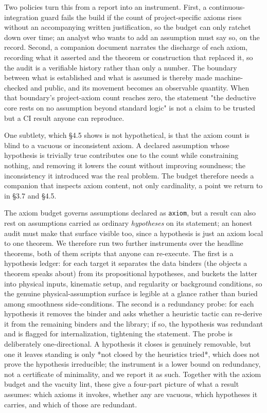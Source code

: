 \documentclass[11pt]{article}
\begin{document}
Two policies turn this from a report into an instrument. First, a continuous-integration guard
fails the build if the count of project-specific axioms rises without an accompanying written
justification, so the budget can only ratchet down over time; an analyst who wants to add an
assumption must say so, on the record. Second, a companion document narrates the discharge of each
axiom, recording what it asserted and the theorem or construction that replaced it, so the audit is
a verifiable history rather than only a number. The boundary between what is established and what is
assumed is thereby made machine-checked and public, and its movement becomes an observable
quantity. When that boundary's project-axiom count reaches zero, the statement "the deductive core
rests on no assumption beyond standard logic" is not a claim to be trusted but a CI result anyone
can reproduce.

One subtlety, which §4.5 shows is not hypothetical, is that the axiom count is blind to a vacuous
or inconsistent axiom. A declared assumption whose hypothesis is trivially true contributes one to
the count while constraining nothing, and removing it lowers the count without improving soundness;
the inconsistency it introduced was the real problem. The budget therefore needs a companion that
inspects axiom content, not only cardinality, a point we return to in §3.7 and §4.5.

The axiom budget governs assumptions declared as \texttt{axiom}, but a result can also rest on
assumptions carried as ordinary \emph{hypotheses} on its statement; an honest audit must make that
surface visible too, since a hypothesis is just an axiom local to one theorem. We therefore run two
further instruments over the headline theorems, both of them scripts that anyone can re-execute. The
first is a hypothesis ledger: for each target it separates the data binders (the objects a theorem
speaks about) from its propositional hypotheses, and buckets the latter into physical inputs,
kinematic setup, and regularity or background conditions, so the genuine physical-assumption surface
is legible at a glance rather than buried among smoothness side-conditions. The second is a
redundancy probe: for each hypothesis it removes the binder and asks whether a heuristic tactic can
re-derive it from the remaining binders and the library; if so, the hypothesis was redundant and is
flagged for internalization, tightening the statement. The probe is deliberately one-directional. A
hypothesis it closes is genuinely removable, but one it leaves standing is only *not closed by
the heuristics tried*, which does not prove the hypothesis irreducible; the instrument is a lower
bound on redundancy, not a certificate of minimality, and we report it as such. Together with the
axiom budget and the vacuity lint, these give a four-part picture of what a result assumes: which
axioms it invokes, whether any are vacuous, which hypotheses it carries, and which of those are
redundant.
\end{document}
